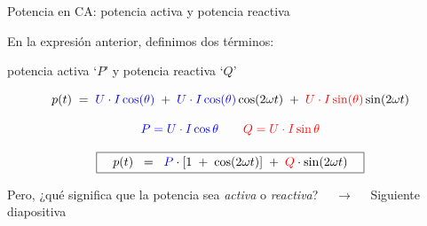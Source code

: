 \documentclass[aspectratio=169, usenames,svgnames,dvipsnames]{beamer}
\begin{document}

\begin{frame}{Potencia en CA: \hspace{3mm}potencia activa y potencia reactiva}

    \vspace{2mm}
    En la expresión anterior, definimos dos términos: 
    
    \vspace{1mm}
    \alert{potencia activa} `$P$' y \alert{potencia reactiva} `$Q$'

    \vspace{1mm}
    \begin{equation*}
      p(t) \; = \; {\color{blue}U \cdot I \cos(\theta)} \; + \; {\color{blue}U \cdot I \cos(\theta)} \cos(2\omega t) \; + \; {\color{red}U \cdot I \sin(\theta)} \sin(2\omega t)
    \end{equation*}
    
    \[
      \color{blue}P = U \cdot I\cos\theta \qquad%
      \color{red}Q = U \cdot I\sin\theta
    \]

    \vspace{-5mm}
    
    \begin{equation*}
      \boxed{\quad p(t) \;\; = \;\; {\color{blue}P} \cdot [1 \; + \; \cos(2\omega t)] \; + \; {\color{red}Q} \cdot \sin(2\omega t) \quad}
    \end{equation*}

    \vspace{5mm}

    Pero, ¿qué significa que la potencia sea \textit{activa} o \textit{reactiva}? $\quad \rightarrow \quad$ Siguiente diapositiva
\end{frame}

\end{document}
